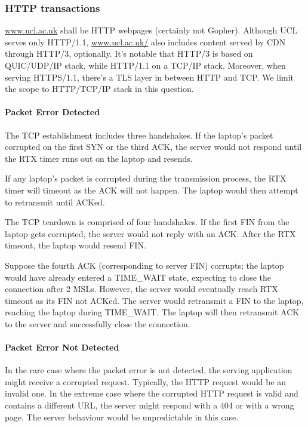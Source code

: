 \documentclass[12pt]{article}
\begin{document}
\subsubsection{HTTP transactions}

\url{www.ucl.ac.uk} shall be HTTP webpages (certainly not Gopher). Although UCL serves only HTTP/1.1, \url{www.ucl.ac.uk/} also includes content served by CDN through HTTP/3, optionally. It's notable that HTTP/3 is based on QUIC/UDP/IP stack, while HTTP/1.1 on a TCP/IP stack. Moreover, when serving HTTPS/1.1, there's a TLS layer in between HTTP and TCP. We limit the scope to HTTP/TCP/IP stack in this question.

\paragraph{Packet Error Detected}

The TCP establishment includes three handshakes. If the laptop's packet corrupted on the first SYN or the third ACK, the server would not respond until the RTX timer runs out on the laptop and resends.

If any laptop's packet is corrupted during the transmission process, the RTX timer will timeout as the ACK will not happen. The laptop would then attempt to retransmit until ACKed.

The TCP teardown is comprised of four handshakes. If the first FIN from the laptop gets corrupted, the server would not reply with an ACK. After the RTX timeout, the laptop would resend FIN.

Suppose the fourth ACK (corresponding to server FIN) corrupts; the laptop would have already entered a TIME\_WAIT state, expecting to close the connection after 2 MSLs. However, the server would eventually reach RTX timeout as its FIN not ACKed. The server would retransmit a FIN to the laptop, reaching the laptop during TIME\_WAIT. The laptop will then retransmit ACK to the server and successfully close the connection.

\paragraph{Packet Error Not Detected}

In the rare case where the packet error is not detected, the serving application might receive a corrupted request. Typically, the HTTP request would be an invalid one. In the extreme case where the corrupted HTTP request is valid and contains a different URL, the server might respond with a 404 or with a wrong page. The server behaviour would be unpredictable in this case.
\end{document}
